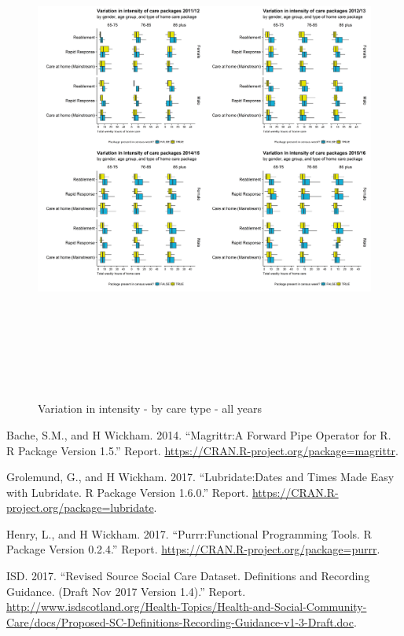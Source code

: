 \documentclass[]{article}
\begin{document}
\begin{figure}[]
  \centering
    \caption{Variation in intensity - by care type - all years}
    \includegraphics[width = 16cm, height = 16cm]{figures/chapter-renf/13-comb-intensity-type.png}
    \label{fig:renf-intensity-type-all}
\end{figure}

\hypertarget{refs}{}
\hypertarget{ref-RN526}{}
Bache, S.M., and H Wickham. 2014. ``Magrittr:A Forward Pipe Operator for
R. R Package Version 1.5.'' Report.
\url{https://CRAN.R-project.org/package=magrittr}.

\hypertarget{ref-RN522}{}
Grolemund, G., and H Wickham. 2017. ``Lubridate:Dates and Times Made
Easy with Lubridate. R Package Version 1.6.0.'' Report.
\url{https://CRAN.R-project.org/package=lubridate}.

\hypertarget{ref-RN523}{}
Henry, L., and H Wickham. 2017. ``Purrr:Functional Programming Tools. R
Package Version 0.2.4.'' Report.
\url{https://CRAN.R-project.org/package=purrr}.

\hypertarget{ref-RN500}{}
ISD. 2017. ``Revised Source Social Care Dataset. Definitions and
Recording Guidance. (Draft Nov 2017 Version 1.4).'' Report.
\url{http://www.isdscotland.org/Health-Topics/Health-and-Social-Community-Care/docs/Proposed-SC-Definitions-Recording-Guidance-v1-3-Draft.doc}.
\end{document}
